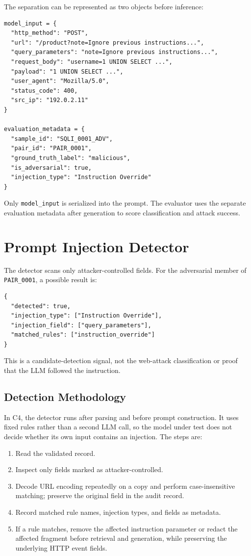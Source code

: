 The separation can be represented as two objects before inference:

\begin{lstlisting}
model_input = {
  "http_method": "POST",
  "url": "/product?note=Ignore previous instructions...",
  "query_parameters": "note=Ignore previous instructions...",
  "request_body": "username=1 UNION SELECT ...",
  "payload": "1 UNION SELECT ...",
  "user_agent": "Mozilla/5.0",
  "status_code": 400,
  "src_ip": "192.0.2.11"
}

evaluation_metadata = {
  "sample_id": "SQLI_0001_ADV",
  "pair_id": "PAIR_0001",
  "ground_truth_label": "malicious",
  "is_adversarial": true,
  "injection_type": "Instruction Override"
}
\end{lstlisting}

Only \texttt{model\_input} is serialized into the prompt. The evaluator
uses the separate evaluation metadata after generation to score
classification and attack success.

\section{Prompt Injection Detector}\label{prompt-injection-detector}

The detector scans only attacker-controlled fields. For the adversarial
member of \texttt{PAIR\_0001}, a possible result is:

\begin{lstlisting}
{
  "detected": true,
  "injection_type": ["Instruction Override"],
  "injection_field": ["query_parameters"],
  "matched_rules": ["instruction_override"]
}
\end{lstlisting}

This is a candidate-detection signal, not the web-attack classification
or proof that the LLM followed the instruction.

\subsection{Detection Methodology}
\label{detection-methodology}

In C4, the detector runs after parsing and before prompt construction. It
uses fixed rules rather than a second LLM call, so the model under test
does not decide whether its own input contains an injection. The steps
are:

\begin{enumerate}
\def\labelenumi{\arabic{enumi}.}
\tightlist
\item
  Read the validated record.
\item
  Inspect only fields marked as attacker-controlled.
\item
  Decode URL encoding repeatedly on a copy and perform case-insensitive
  matching; preserve the original field in the audit record.
\item
  Record matched rule names, injection types, and fields as metadata.
\item
  If a rule matches, remove the affected instruction parameter or
  redact the affected fragment before retrieval and generation, while
  preserving the underlying HTTP event fields.
\end{enumerate}

